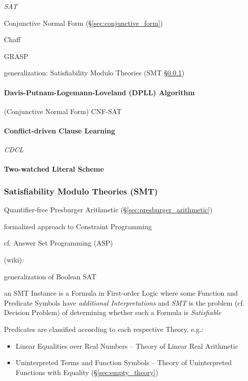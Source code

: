\emph{SAT}

Conjunctive Normal Form (\S\ref{sec:conjunctive_form})

Chaff

GRASP

generalization: Satisfiability Modulo Theories (SMT \S\ref{sec:smt})




\paragraph{Davis-Putnam-Logemann-Loveland (DPLL) Algorithm}
\label{sec:dpll}\hfill

(Conjunctive Normal Form) CNF-SAT



\paragraph{Conflict-driven Clause Learning}\label{sec:cdcl}\hfill

\emph{CDCL}



\paragraph{Two-watched Literal Scheme}\label{sec:twowatched_literal}\hfill



\subsubsection{Satisfiability Modulo Theories (SMT)}\label{sec:smt}

Quantifier-free Presburger Arithmetic
(\S\ref{sec:presburger_arithmetic})

formalized approach to Constraint Programming

cf. Answer Set Programming (ASP)

(wiki):

generalization of Boolean SAT

an SMT Instance is a Formula in First-order Logic where some Function
and Predicate Symbols have \emph{additional Interpretations} and
\emph{SMT} is the problem (cf. Decision Problem) of determining
whether such a Formula is \emph{Satisfiable}

Predicates are classified according to each respective Theory, e.g.:
\begin{itemize}
  \item Linear Equalities over Real Numbers -- Theory of Linear Real
    Arithmetic
  \item Uninterpreted Terms and Function Symbols -- Theory of
    Uninterpreted Functions with Equality (\S\ref{sec:empty_theory})
\end{itemize}

